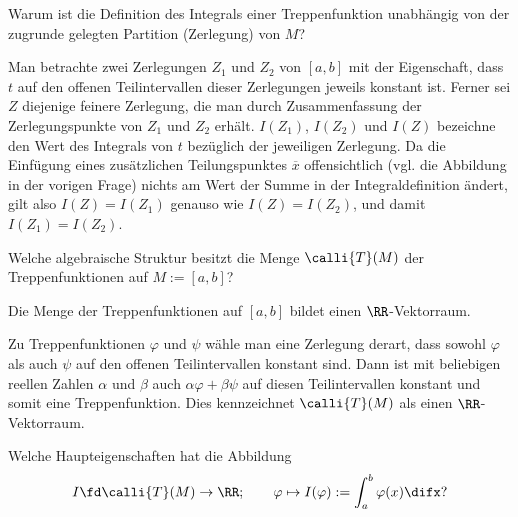 \begin{frage}
Warum ist die Definition des Integrals einer Treppenfunktion 
unabhängig von der zugrunde gelegten Partition (Zerlegung) von $M$? 
\end{frage}


\begin{antwort}
Man betrachte zwei Zerlegungen
$Z_1$ und $Z_2$ von $[a,b]$ mit der Eigenschaft, 
dass $t$ auf den offenen Teilintervallen dieser Zerlegungen jeweils 
konstant ist. Ferner sei $Z$ diejenige feinere Zerlegung, die man durch 
Zusammenfassung der Zerlegungspunkte von $Z_1$ und $Z_2$ erhält. 
$I(Z_1)$, $I(Z_2)$ und $I(Z)$ 
bezeichne den Wert des Integrals von $t$ bezüglich 
der jeweiligen Zerlegung. Da die Einfügung eines zusätzlichen   
Teilungspunktes $\overline{x}$ 
offensichtlich (vgl. die Abbildung in der vorigen Frage) nichts am Wert 
der Summe in der Integraldefinition ändert, gilt also $I(Z)=I(Z_1)$ 
genauso wie $I(Z)=I(Z_2)$, und damit $I(Z_1)=I(Z_2)$.      
\AntEnd
\end{antwort}


\begin{frage}
Welche algebraische Struktur besitzt 
die Menge $\calli{T}(M)$ der Treppenfunktionen auf $M:=[a,b]$?
\end{frage}


\begin{antwort}
 
Die Menge der Treppenfunktionen auf $[a,b]$ 
bildet einen $\RR$-Vektorraum. 

Zu Treppenfunktionen $\varphi$ und $\psi$ wähle man eine Zerlegung derart, 
dass sowohl $\varphi$ als auch $\psi$ auf den offenen Teilintervallen 
konstant sind. Dann ist mit beliebigen 
reellen Zahlen $\alpha$ und $\beta$ 
auch $\alpha\varphi+\beta\psi$ auf diesen Teilintervallen 
konstant und somit eine Treppenfunktion. 
Dies kennzeichnet $\calli{T}(M)$ als einen $\RR$-Vektorraum. 
\AntEnd
\end{antwort}



\begin{frage}\label{06_trve}
Welche Haupteigenschaften hat die Abbildung
\[
I \fd \calli{T}(M)\to \RR; \qquad 
\varphi \mapsto I(\varphi) := \int_a^b \varphi(x)\difx \text{?}
\]
\end{frage}


